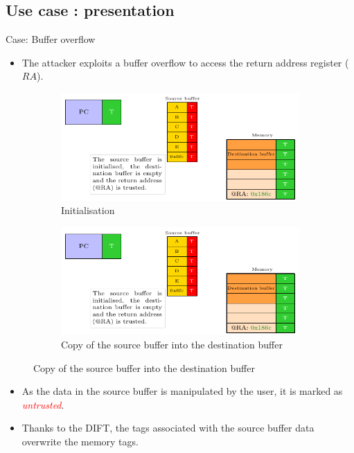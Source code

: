 \subsection{Use case : presentation}
\begin{frame}{Case: Buffer overflow}
    \begin{itemize}
        \item The attacker exploits a buffer overflow to access the return address register ($RA$).
    \end{itemize}

    \begin{figure}
        \centering
        \begin{subfigure}[l]{.45\textwidth}
            \centering
            \includegraphics[width=.9\textwidth, page=1]{src/2_vuln_assessment/img/buffer_overflow/schemaPedagogique.pdf}
            \caption{Initialisation}
            \label{fig:bo_1st_step}
        \end{subfigure}
        \begin{subfigure}[r]{.45\textwidth}
            \centering
            \includegraphics[width=.9\textwidth, page=2]{src/2_vuln_assessment/img/buffer_overflow/schemaPedagogique.pdf}
            \caption{Copy of the source buffer into the destination buffer}
            \label{fig:bo_2_step}
        \end{subfigure}
    \end{figure}

    \begin{itemize}
        \item As the data in the source buffer is manipulated by the user, it is marked as \textcolor{red}{\textit{untrusted}}.
        \item Thanks to the DIFT, the tags associated with the source buffer data overwrite the memory tags.
    \end{itemize}
\end{frame}

